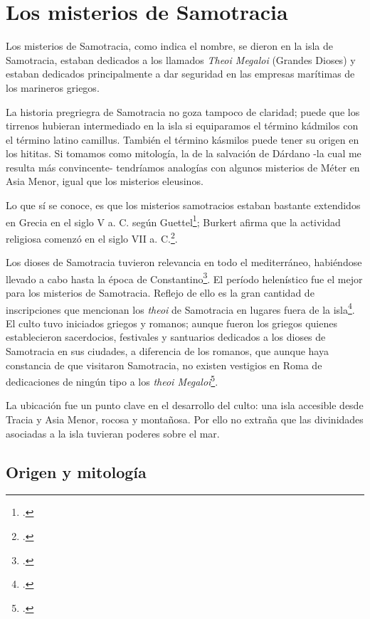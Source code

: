 \chapter{Los misterios de Samotracia}

Los misterios de Samotracia, como indica el nombre, se dieron en la isla de Samotracia, estaban dedicados a los llamados\textit{ Theoi Megaloi} (Grandes Dioses) y estaban dedicados principalmente a dar seguridad en las empresas marítimas de los marineros griegos.

La historia pregriegra de Samotracia no goza tampoco de claridad; puede que los tirrenos hubieran intermediado en la isla si equiparamos el término kádmilos con el término latino camillus. También el término kásmilos puede tener su origen en los hititas. Si tomamos como mitología, la de la salvación de Dárdano -la cual me resulta más convincente- tendríamos analogías con algunos misterios de Méter en Asia Menor, igual que los misterios eleusinos.

Lo que sí se conoce, es que los misterios samotracios estaban bastante extendidos en Grecia en el siglo V a. C. según Guettel\footcite[4-5]{guettelcoleTheoiMegaloiCult1984}; Burkert afirma que la actividad religiosa comenzó en el siglo VII a. C.\footcite[376]{burkertReligionGriegaArcaica2007}.

Los dioses de Samotracia tuvieron relevancia en todo el mediterráneo, habiéndose llevado a cabo hasta la época de Constantino\footcite[376]{burkertReligionGriegaArcaica2007}. El período helenístico fue el mejor para los misterios de Samotracia. Reflejo de ello es la gran cantidad de inscripciones que mencionan los \textit{theoi} de Samotracia en lugares fuera de la isla\footcite[21]{guettelcoleTheoiMegaloiCult1984}. El culto tuvo iniciados griegos y romanos; aunque fueron los griegos quienes establecieron sacerdocios, festivales y santuarios dedicados a los dioses de Samotracia en sus ciudades, a diferencia de los romanos, que aunque haya constancia de que visitaron Samotracia, no existen vestigios en Roma de dedicaciones de ningún tipo a los \textit{theoi Megaloi}\footcite[5]{guettelcoleTheoiMegaloiCult1984}.
 
La ubicación fue un punto clave en el desarrollo del culto: una isla accesible desde Tracia y Asia Menor, rocosa y montañosa. Por ello no extraña que las divinidades asociadas a la isla tuvieran poderes sobre el mar. 

\section{Origen y mitología}

